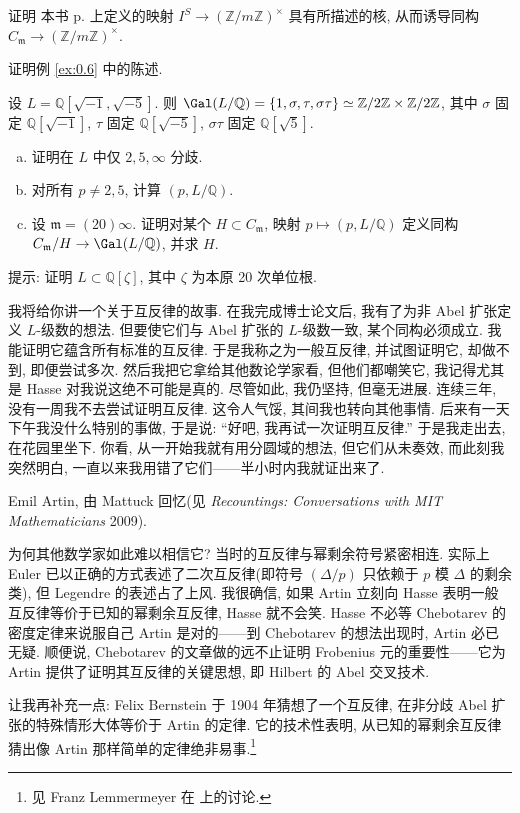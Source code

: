 \begin{exercise}\label{ex:0.13}
证明 本书 p.\pageref{pg:orig4} 上定义的映射 $I^{S} \to (\mathbb{Z}/m\mathbb{Z})^{\times}$ 具有所描述的核, 从而诱导同构 $C_{\mathfrak{m}} \to (\mathbb{Z}/m\mathbb{Z})^{\times}$.
\end{exercise}

\begin{exercise}\label{ex:0.14}
证明例 \ref{ex:0.6} 中的陈述.
\end{exercise}

\begin{exercise}\label{ex:0.15}
设 $L = \mathbb{Q}[\sqrt{-1}, \sqrt{-5}]$. 则 $\Gal(L/\mathbb{Q}) = \{1, \sigma, \tau, \sigma\tau\} \simeq \mathbb{Z}/2\mathbb{Z} \times \mathbb{Z}/2\mathbb{Z}$, 其中 $\sigma$ 固定 $\mathbb{Q}[\sqrt{-1}]$, $\tau$ 固定 $\mathbb{Q}[\sqrt{-5}]$, $\sigma\tau$ 固定 $\mathbb{Q}[\sqrt{5}]$.
\begin{enumerate}[(a)]
\item 证明在 $L$ 中仅 $2, 5, \infty$ 分歧.
\item 对所有 $p \neq 2, 5$, 计算 $(p, L/\mathbb{Q})$.
\item 设 $\mathfrak{m} = (20)\infty$. 证明对某个 $H \subset C_{\mathfrak{m}}$, 映射 $p \mapsto (p, L/\mathbb{Q})$ 定义同构 $C_{\mathfrak{m}}/H \to \Gal(L/\mathbb{Q})$, 并求 $H$.
\end{enumerate}
提示: 证明 $L \subset \mathbb{Q}[\zeta]$, 其中 $\zeta$ 为本原 20 次单位根.
\end{exercise}

我将给你讲一个关于互反律的故事. 在我完成博士论文后, 我有了为非 Abel 扩张定义 $L$-级数的想法. 但要使它们与 Abel 扩张的 $L$-级数一致, 某个同构必须成立. 我能证明它蕴含所有标准的互反律. 于是我称之为一般互反律, 并试图证明它, 却做不到, 即便尝试多次. 然后我把它拿给其他数论学家看, 但他们都嘲笑它, 我记得尤其是 Hasse 对我说这绝不可能是真的. 尽管如此, 我仍坚持, 但毫无进展. 连续三年, 没有一周我不去尝试证明互反律. 这令人气馁, 其间我也转向其他事情. 后来有一天下午我没什么特别的事做, 于是说: “好吧, 我再试一次证明互反律.” 于是我走出去, 在花园里坐下. 你看, 从一开始我就有用分圆域的想法, 但它们从未奏效, 而此刻我突然明白, 一直以来我用错了它们——半小时内我就证出来了.

Emil Artin, 由 Mattuck 回忆(见 \emph{Recountings: Conversations with MIT Mathematicians} 2009).

为何其他数学家如此难以相信它? 当时的互反律与幂剩余符号紧密相连. 实际上 Euler 已以正确的方式表述了二次互反律(即符号 $(\Delta/p)$ 只依赖于 $p$ 模 $\Delta$ 的剩余类), 但 Legendre 的表述占了上风. 我很确信, 如果 Artin 立刻向 Hasse 表明一般互反律等价于已知的幂剩余互反律, Hasse 就不会笑. Hasse 不必等 Chebotarev 的密度定律来说服自己 Artin 是对的——到 Chebotarev 的想法出现时, Artin 必已无疑. 顺便说, Chebotarev 的文章做的远不止证明 Frobenius 元的重要性——它为 Artin 提供了证明其互反律的关键思想, 即 Hilbert 的 Abel 交叉技术.

让我再补充一点: Felix Bernstein 于 1904 年猜想了一个互反律, 在非分歧 Abel 扩张的特殊情形大体等价于 Artin 的定律. 它的技术性表明, 从已知的幂剩余互反律猜出像 Artin 那样简单的定律绝非易事.\footnote{见 Franz Lemmermeyer 在  上的讨论.}

\renewcommand{\thetheorem}{\thesection.\arabic{theorem}}

